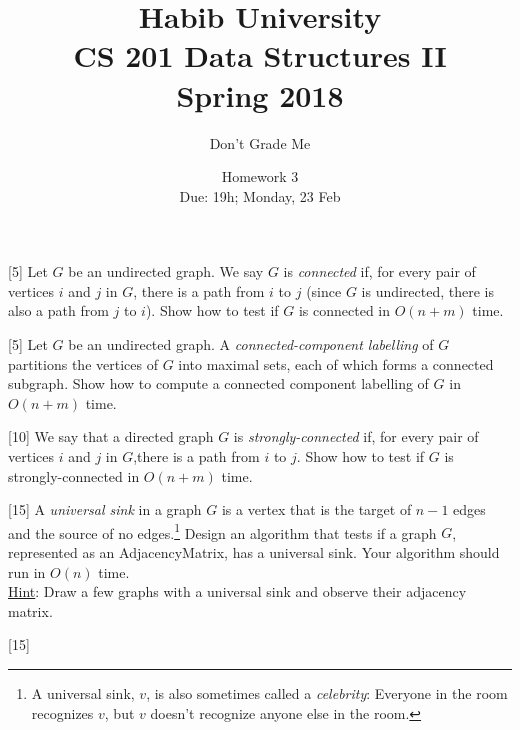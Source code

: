 \documentclass[addpoints]{exam}
\title{Habib University\\CS 201 Data Structures II\\Spring 2018}
\author{Don't Grade Me}  %
\date{Homework 3\\Due: 19h; Monday, 23 Feb}
\begin{document}
\maketitle

\begin{questions}

  [5]
  Let $G$ be an undirected graph. We say $G$ is {\it connected} if, for every pair of vertices $i$ and $j$ in $G$, there is a path from $i$ to $j$ (since $G$ is undirected, there is also a path from $j$ to $i$). Show how to test if $G$ is connected in $O(n + m)$ time.
  \begin{solution}
  \end{solution}

  [5]
  Let $G$ be an undirected graph. A {\it connected-component labelling} of $G$ partitions the vertices of $G$ into maximal sets, each of which forms a connected subgraph. Show how to compute a connected component labelling of $G$ in $O(n + m)$ time.
  \begin{solution}
  \end{solution}

  [10]
  We say that a directed graph $G$ is {\it strongly-connected} if, for every pair of vertices $i$ and $j$ in $G$,there is a path from $i$ to $j$. Show how to test if $G$ is strongly-connected in $O(n + m)$ time.
  \begin{solution}
  \end{solution}

  [15]
  A {\it universal sink} in a graph $G$ is a vertex that is the target of $n−1$ edges and the source of no edges.\footnote{A universal sink, $v$, is also sometimes called a {\it celebrity}: Everyone in the room recognizes $v$, but $v$ doesn’t recognize anyone else in the room.} Design an algorithm that tests if a graph $G$, represented as an AdjacencyMatrix, has a universal sink. Your algorithm should run in $O(n)$ time.\\
  \underline{Hint}: Draw a few graphs with a universal sink and observe their adjacency matrix.
  \begin{solution}
  \end{solution}


  [15]


\end{questions}
\end{document}
